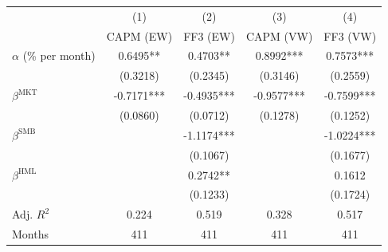 \begin{tabular}{lcccc}
\toprule
 & (1) & (2) & (3) & (4) \\
 & CAPM (EW) & FF3 (EW) & CAPM (VW) & FF3 (VW) \\
\midrule
$\alpha$ (\% per month) & 0.6495** & 0.4703** & 0.8992*** & 0.7573*** \\
 & (0.3218) & (0.2345) & (0.3146) & (0.2559) \\
$\beta^{\mathrm{MKT}}$ & -0.7171*** & -0.4935*** & -0.9577*** & -0.7599*** \\
 & (0.0860) & (0.0712) & (0.1278) & (0.1252) \\
$\beta^{\mathrm{SMB}}$ &  & -1.1174*** &  & -1.0224*** \\
 &  & (0.1067) &  & (0.1677) \\
$\beta^{\mathrm{HML}}$ &  & 0.2742** &  & 0.1612 \\
 &  & (0.1233) &  & (0.1724) \\
\midrule
Adj. $R^2$ & 0.224 & 0.519 & 0.328 & 0.517 \\
Months & 411 & 411 & 411 & 411 \\
\bottomrule
\end{tabular}
